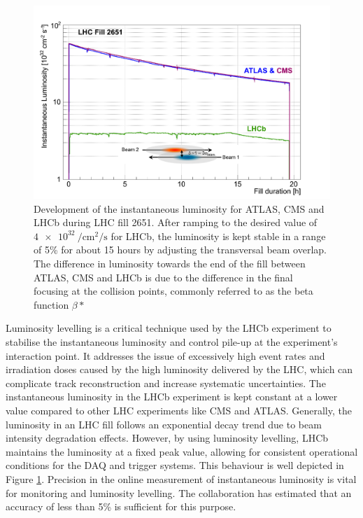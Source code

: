 \begin{figure}
    \centering
    \includegraphics[width=\textwidth]{figures/luminosity_leveling.png}
    \caption{Development of the instantaneous luminosity for ATLAS, CMS and LHCb during LHC fill 2651. After ramping to the desired value of $\SI{4e32}{\per\centi\meter\squared\per\second}$ for LHCb, the luminosity is kept stable in a range of 5\% for about 15 hours by adjusting the transversal beam overlap.
    The difference in luminosity towards the end of the fill between ATLAS, CMS and LHCb is due to the difference in the final focusing at the collision points, commonly referred to as the beta function $\beta*$}
    \label{fig:lumi-leveling}
\end{figure}

Luminosity levelling is a critical technique used by the LHCb experiment to stabilise the instantaneous luminosity and control pile-up at the experiment's interaction point. It addresses the issue of excessively high event rates and irradiation doses caused by the high luminosity delivered by the LHC, which can complicate track reconstruction and increase systematic uncertainties.
The instantaneous luminosity in the LHCb experiment is kept constant at a lower value compared to other LHC experiments like CMS and ATLAS. Generally, the luminosity in an LHC fill follows an exponential decay trend due to beam intensity degradation effects. However, by using luminosity levelling, LHCb maintains the luminosity at a fixed peak value, allowing for consistent operational conditions for the DAQ and trigger systems.  This behaviour is well depicted in Figure \ref{fig:lumi-leveling}. Precision in the online measurement of instantaneous luminosity is vital for monitoring and luminosity levelling. The collaboration has estimated that an accuracy of less than 5\% is sufficient for this purpose. 


